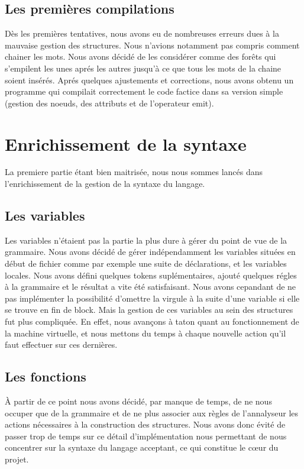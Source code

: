 \documentclass[12pt]{article}
\begin{document}
\subsection{Les premières compilations}

Dès les premières tentatives, nous avons eu de nombreuses erreurs dues à la mauvaise
gestion des structures. Nous n'avions notamment pas compris comment chainer
les mots. Nous avons décidé de les considérer comme des forêts qui s'empilent les
unes aprés les autres jusqu'à ce que tous les mots de la chaine soient insérés.
Aprés quelques ajustements et corrections, nous avons obtenu un programme qui
compilait correctement le code factice dans sa version simple (gestion des noeuds,
des attributs et de l'operateur emit).

\newpage


\section{Enrichissement de la syntaxe}

La premiere partie étant bien maitrisée, nous nous sommes lancés dans l'enrichissement
de la gestion de la syntaxe du langage.

\subsection{Les variables}

Les variables n'étaient pas la partie la plus dure à gérer du point de vue de
la grammaire. Nous avons décidé de gérer indépendamment les variables situées
en début de fichier comme par exemple une suite de déclarations, et les variables locales.
Nous avons défini quelques tokens suplémentaires, ajouté quelques régles à la
grammaire et le résultat a vite été satisfaisant. Nous avons cepandant de ne pas
implémenter la possibilité d'omettre la virgule à la suite d'une variable si elle se
trouve en fin de block.
\newline
Mais la gestion de ces variables au sein des structures fut plus compliquée.
En effet, nous avançons à taton quant au fonctionnement de la machine virtuelle, et
nous mettons du temps à chaque nouvelle action qu'il faut effectuer sur ces
dernières.

\subsection{Les fonctions}
À partir de ce point nous avons décidé, par manque de temps, de ne nous occuper
que de la grammaire et de ne plus associer aux règles de l'annalyseur les actions
nécessaires à la construction des structures. Nous avons donc évité de passer trop
de temps sur ce détail d'implémentation nous permettant de nous concentrer sur la 
syntaxe du langage acceptant, ce qui constitue le cœur du projet.
\end{document}
